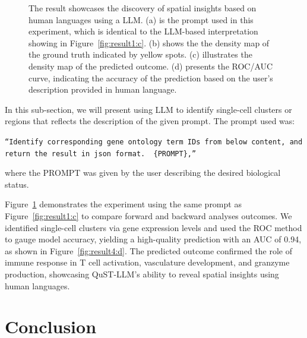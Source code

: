 \documentclass{article}
\begin{document}
\begin{figure}[t]
	\hfill%
\caption{The result showcases the discovery of spatial insights based on human languages using a LLM. (a) is the prompt used in this experiment, which is identical to the LLM-based interpretation showing in Figure~\ref{fig:result1:c}. (b) shows the the density map of the ground truth indicated by yellow spots. (c) illustrates the density map of the predicted outcome. (d) presents the ROC/AUC curve, indicating the accuracy of the prediction based on the user's description provided in human language.}
	\label{fig:result4}
\end{figure}

In this sub-section, we will present using LLM to identify single-cell clusters or regions that reflects the description of the given prompt. The prompt used was:
\begin{center}
	\parbox{0.9\textwidth}{
		\texttt{``Identify corresponding gene ontology term IDs from below content, and return the result in json format. \\\\\{PROMPT\},''}}%
\end{center}
where the PROMPT was given by the user describing the desired biological status. 

Figure~\ref{fig:result4} demonstrates the experiment using the same prompt as Figure~\ref{fig:result1:c} to compare forward and backward analyses outcomes. We identified single-cell clusters via gene expression levels and used the ROC method to gauge model accuracy, yielding a high-quality prediction with an AUC of 0.94, as shown in Figure~\ref{fig:result4:d}. The predicted outcome confirmed the role of immune response in T cell activation, vasculature development, and granzyme production, showcasing QuST-LLM's ability to reveal spatial insights using human languages.

\section{Conclusion}
\end{document}
